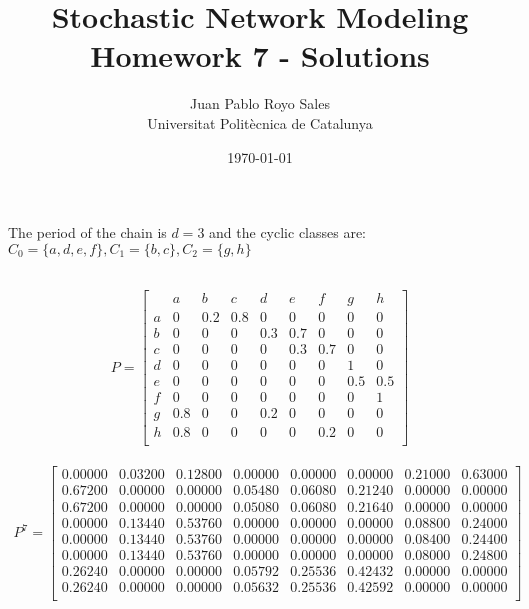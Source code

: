 \documentclass[12pt, a4paper]{article}
\title{%
  Stochastic Network Modeling \\
  Homework 7 - Solutions
}
\author{%
  Juan Pablo Royo Sales\\
  \small{Universitat Politècnica de Catalunya}
}
\date\today
\begin{document}
\maketitle

\section{}
\subsection{}
The period of the chain is $d = 3$ and the cyclic classes are: $C_0 = \{a,d,e,f\}, C_1 = \{b,c\}, C_2=\{g,h\}$

\subsection{}
\begin{align*}
  P = \begin{bmatrix}
       & a & b & c & d & e & f & g & h \\
     a & 0 & 0.2 & 0.8 & 0 & 0 & 0 & 0 & 0 \\
     b & 0 & 0 & 0 & 0.3 & 0.7 & 0 & 0 & 0 \\
     c & 0 & 0 & 0 & 0 & 0.3 & 0.7 & 0 & 0 \\
     d & 0 & 0 & 0 & 0 & 0 & 0 & 1 & 0 \\
     e & 0 & 0 & 0 & 0 & 0 & 0 & 0.5 & 0.5 \\
     f & 0 & 0 & 0 & 0 & 0 & 0 & 0 & 1 \\
     g & 0.8 & 0 & 0 & 0.2 & 0 & 0 & 0 & 0 \\
     h & 0.8 & 0 & 0 & 0 & 0 & 0.2 & 0 & 0 \\
  \end{bmatrix}
\end{align*}

\begin{align*}
  P^7 = \begin{bmatrix}
   0.00000 & 0.03200 & 0.12800 &  0.00000 &  0.00000 &  0.00000 &  0.21000 &  0.63000\\
   0.67200 & 0.00000 & 0.00000 &  0.05480 &  0.06080 &  0.21240 &  0.00000 &  0.00000\\
   0.67200 & 0.00000 & 0.00000 &  0.05080 &  0.06080 &  0.21640 &  0.00000 &  0.00000\\
   0.00000 & 0.13440 & 0.53760 &  0.00000 &  0.00000 &  0.00000 &  0.08800 &  0.24000\\
   0.00000 & 0.13440 & 0.53760 &  0.00000 &  0.00000 &  0.00000 &  0.08400 &  0.24400\\
   0.00000 & 0.13440 & 0.53760 &  0.00000 &  0.00000 &  0.00000 &  0.08000 &  0.24800\\
   0.26240 & 0.00000 & 0.00000 &  0.05792 &  0.25536 &  0.42432 &  0.00000 &  0.00000\\
   0.26240 & 0.00000 & 0.00000 &  0.05632 &  0.25536 &  0.42592 &  0.00000 &  0.00000\\
 \end{bmatrix}
\end{align*}
\end{document}

